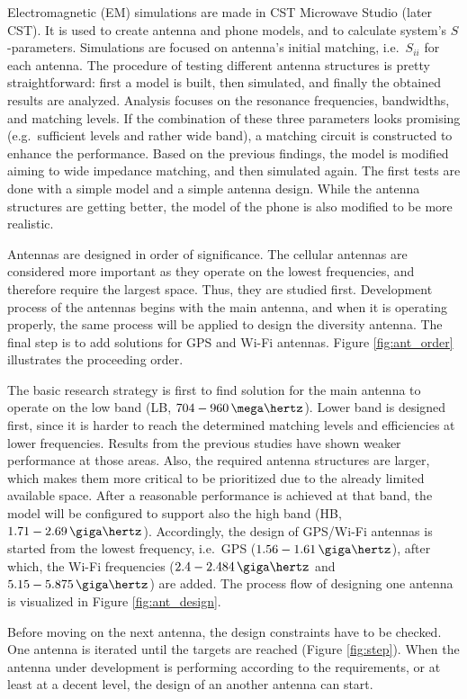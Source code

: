 Electromagnetic (EM) simulations are made in CST Microwave Studio \cite{cst} (later CST). It is used to create antenna and phone models, and to calculate system's $S$-parameters. Simulations are focused on antenna's initial matching, i.e.\ $S_{ii}$ for each antenna. The procedure of testing different antenna structures is pretty straightforward: first a model is built, then simulated, and finally the obtained results are analyzed. Analysis focuses on the resonance frequencies, bandwidths, and matching levels. If the combination of these three parameters looks promising (e.g.\ sufficient levels and rather wide band), a matching circuit is constructed to enhance the performance. Based on the previous findings, the model is modified aiming to wide impedance matching, and then simulated again. The first tests are done with a simple model and a simple antenna design. While the antenna structures are getting better, the model of the phone is also modified to be more realistic.

Antennas are designed in order of significance. The cellular antennas are considered more important as they operate on the lowest frequencies, and therefore require the largest space. Thus, they are studied first. Development process of the antennas begins with the main antenna, and when it is operating properly, the same process will be applied to design the diversity antenna. The final step is to add solutions for GPS and Wi-Fi antennas. Figure \ref{fig:ant_order} illustrates the proceeding order. 

The basic research strategy is first to find solution for the main antenna to operate on the low band (LB, $704-960\,\mega\hertz$). Lower band is designed first, since it is harder to reach the determined matching levels and efficiencies at lower frequencies. Results from the previous studies have shown weaker performance at those areas. Also, the required antenna structures are larger, which makes them more critical to be prioritized due to the already limited available space. After a reasonable performance is achieved at that band, the model will be configured to support also the high band (HB, $1.71-2.69\,\giga\hertz$). Accordingly, the design of GPS/Wi-Fi antennas is started from the lowest frequency, i.e.\ GPS ($1.56-1.61\,\giga\hertz$), after which, the Wi-Fi frequencies ($2.4-2.484\,\giga\hertz$ and $5.15-5.875\,\giga\hertz$) are added. The process flow of designing one antenna is visualized in Figure \ref{fig:ant_design}.

Before moving on the next antenna, the design constraints have to be checked. One antenna is iterated until the targets are reached (Figure \ref{fig:step}). When the antenna under development is performing according to the requirements, or at least at a decent level, the design of an another antenna can start.

